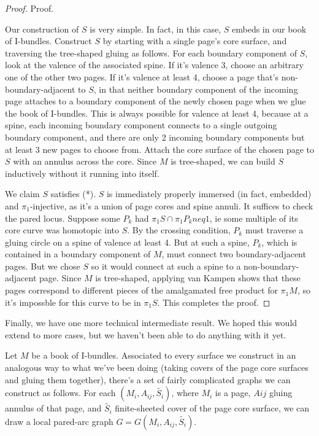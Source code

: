 \documentclass[12pt]{amsart}
\theoremstyle{definition}
\begin{document}
\begin{proof}

Proof.

Our construction of $S$ is very simple. In fact, in this case, $S$ embeds in our
book of I-bundles. Construct $S$ by starting with a single page's core surface,
and traversing the tree-shaped gluing as follows. For each boundary component
of $S$, look at the valence of the associated spine. If it's valence 3, choose an
arbitrary one of the other two pages. If it's valence at least 4, choose a page
that's non-boundary-adjacent to $S$, in that neither boundary component of the
incoming page attaches to a boundary component of the newly chosen page when we
glue the book of I-bundles. This is always possible for valence at least 4,
because at a spine, each incoming boundary component connects to a single
outgoing boundary component, and there are only 2 incoming boundary components
but at least 3 new pages to choose from. Attach the core surface of the chosen
page to $S$ with an annulus across the core. Since $M$ is tree-shaped, we can build
$S$ inductively without it running into itself.

We claim $S$ satisfies (*). $S$ is immediately properly immersed (in fact,
embedded) and $\pi_1$-injective, as it's a union of page cores and spine annuli. It
suffices to check the pared locus. Suppose some $P_k$ had $\pi_1S \cap \pi_1P_k neq
1$, ie some multiple of its core curve was homotopic into $S$. By the crossing
condition, $P_k$ must traverse a gluing circle on a spine of valence at least 4.
But at such a spine, $P_k$, which is contained in a boundary component of $M$, must
connect two boundary-adjacent pages. But we chose $S$ so it would
connect at such a spine to a non-boundary-adjacent page. Since $M$ is
tree-shaped, applying van Kampen shows that these pages correspond to
different pieces of the amalgamated free product for $\pi_1M$, so it's impossble
for this curve to be in $\pi_1S$. This completes the proof.

\end{proof}

Finally, we have one more technical intermediate result. We hoped this would
extend to more cases, but we haven't been able to do anything with it yet.

Let $M$ be a book of I-bundles. Associated to every surface we construct in an
analogous way to what we've been doing (taking covers of the page core surfaces
and gluing them together), there's a set of fairly complicated graphs we can
construct as follows. For each $(M_i,A_{ij},\widetilde{S_i})$, where $M_i$ is a page, $Aij$ gluing
annulus of that page, and $\widetilde{S_i}$ finite-sheeted cover of the page core
surface, we can draw a local pared-arc graph $G=G(M_i,A_{ij},\widetilde{S_i})$.
\end{document}
